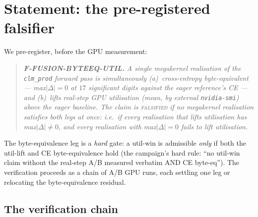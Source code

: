 \documentclass[11pt,a4paper]{article}
\begin{document}
\section{Statement: the pre-registered falsifier}
\label{sec:method}

We pre-register, before the GPU measurement:

\begin{quote}\itshape
\textbf{F-FUSION-BYTEEQ-UTIL.} A single megakernel realisation of the
\texttt{clm\_prod} forward pass is simultaneously (a)~cross-entropy
byte-equivalent --- max$|\Delta|=0$ at $17$ significant digits against the
eager reference's CE --- \emph{and} (b)~lifts real-step GPU utilisation
(mean, by external \texttt{nvidia-smi}) above the eager baseline. The claim
is \textsc{falsified} if no megakernel realisation satisfies both legs at
once: i.e.\ if every realisation that lifts utilisation has max$|\Delta|\neq
0$, \emph{and} every realisation with max$|\Delta|=0$ fails to lift
utilisation.
\end{quote}

\noindent The byte-equivalence leg is a \emph{hard} gate: a util-win is
admissible \emph{only} if both the util-lift and CE byte-equivalence hold
(the campaign's hard rule: ``no util-win claim without the real-step A/B
measured verbatim AND CE byte-eq''). The verification proceeds as a chain
of A/B GPU runs, each settling one leg or relocating the
byte-equivalence residual.

\subsection{The verification chain}
\label{sec:chain}
\end{document}
